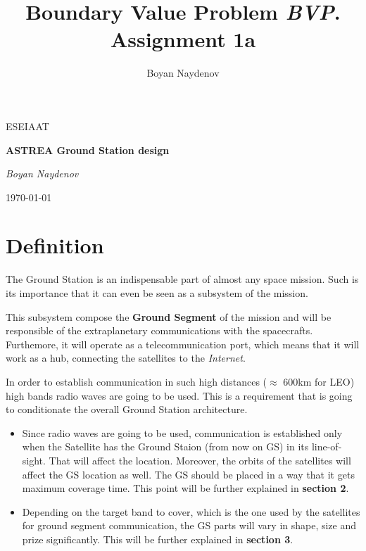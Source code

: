 \documentclass[12pt,a4paper]{article}
\author{Boyan Naydenov}
\title{Boundary Value Problem \textit{BVP}. Assignment 1a}
\begin{document}
\begin{titlepage}
	\centering
	\vspace{4.5cm}
	{\scshape ESEIAAT \par}
	{\scshape\Large \par}
	\vspace{1.5cm}
	{\huge\bfseries ASTREA Ground Station design \par}
	\vspace{10cm}
	\vspace{3cm}
	{\Large\itshape Boyan Naydenov\par}
	\vfill
	\vspace{1cm}
	\today
\end{titlepage}
\tableofcontents
\pagebreak
\section{Definition}
The Ground Station is an indispensable part of almost any space mission. Such is its importance that it can even be seen as a subsystem of the mission.
\newline

This subsystem compose the \textbf{Ground Segment} of the mission and will be responsible of the extraplanetary communications with the spacecrafts. Furthemore, it will operate as a telecommunication port, which means that it will work as a hub, connecting the satellites to the \textit{Internet}.
\newline

In order to establish communication in such high distances ($\approx$ 600km for LEO) high bands radio waves are going to be used. This is a requirement that is going to conditionate the overall Ground Station architecture.

\begin{itemize}
\item Since radio waves are going to be used, communication is established only when the Satellite has the Ground Staion (from now on GS)  in its line-of-sight. That will affect the location. Moreover, the orbits of the satellites will affect the GS location as well. The GS should be placed in a way that it gets maximum coverage time. This point will be further explained in \textbf{section 2}.

\item Depending on the target band to cover, which is the one used by the satellites for ground segment communication, the GS parts will vary in shape, size and prize significantly. This will be further explained in \textbf{section 3}.

\end{itemize}
\end{document}
